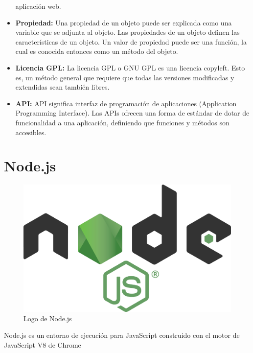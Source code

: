 \documentclass[openright,twoside,10pt]{book}
\begin{document}
\begin{itemize}
      aplicación web.
    \item
      \textbf{Propiedad:} Una propiedad de un objeto puede ser explicada
      como una variable que se adjunta al objeto. Las propiedades de un
      objeto definen las características de un objeto. Un valor de propiedad
      puede ser una función, la cual es conocida entonces como un método del
      objeto.
    \item
      \textbf{Licencia GPL:} La licencia GPL o GNU GPL es una licencia
      copyleft. Esto es, un método general que requiere que todas las
      versiones modificadas y extendidas sean también libres.
    \item
      \textbf{API:} API significa interfaz de programación de aplicaciones
      (Application Programming Interface). Las APIs ofrecen una forma de
      estándar de dotar de funcionalidad a una aplicación, definiendo que
      funciones y métodos son accesibles.
    \end{itemize}
    
    \section{Node.js}\label{node.js}
    
    \begin{figure}[H]
        \begin{center}
            \includegraphics[scale=0.05]{img/nodejs.png}
        \end{center}
        \caption{Logo de Node.js}
    \end{figure}
    
    Node.js es un entorno de ejecución para JavaScript construido con el
    motor de JavaScript V8 de Chrome
    
\end{document}
